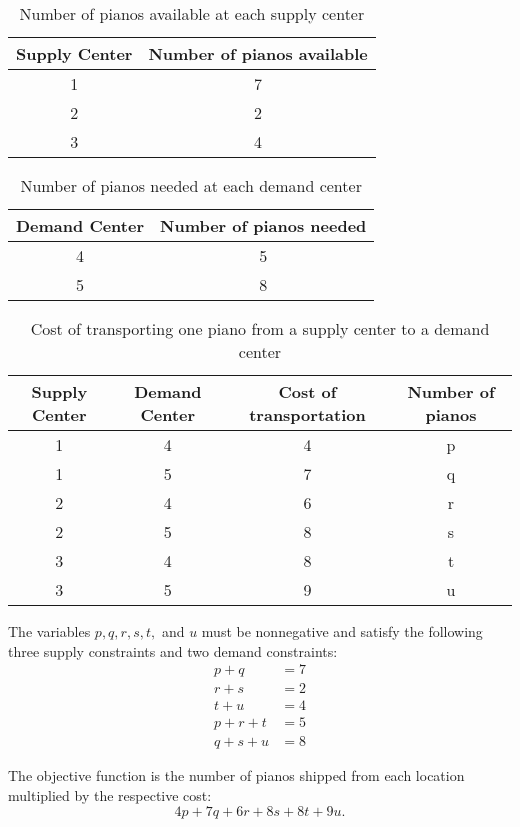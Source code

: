 \begin{table}[h]
\centering
\begin{tabular}{|c|c|}
Supply Center & Number of pianos available\\
\hline
1 & 7\\
2 & 2\\
3 & 4\\
\end{tabular}

\caption{Number of pianos available at each supply center}
\label{tab:supply}
\end{table}

\begin{table}[h]
\centering
\begin{tabular}{|c|c|}
Demand Center & Number of pianos needed\\
\hline
4 & 5\\
5 & 8\\
\end{tabular}

\caption{Number of pianos needed at each demand center}
\label{tab:demand}
\end{table}

\begin{table}[h]
\centering
\begin{tabular}{|c|c|c|c|}
Supply Center & Demand Center & Cost of transportation & Number of pianos\\
\hline
1 & 4 & 4 & p\\
1 & 5 & 7 & q\\
2 & 4 & 6 & r\\
2 & 5 & 8 & s\\
3 & 4 & 8 & t\\
3 & 5 & 9 & u\\
\end{tabular}
\caption{Cost of transporting one piano from a supply center to a demand center}
\label{tab:cost}
\end{table}

The variables $p,q,r,s,t,$ and $u$ must be nonnegative and satisfy the following three supply constraints and two demand constraints:
\begin{align*}
p + q  &= 7\\
r + s  &= 2\\
t + u  &= 4\\
p + r + t &= 5\\
q + s + u &= 8
\end{align*}

The objective function is the number of pianos shipped from each location multiplied by the respective cost:
\[
4p + 7q + 6r + 8s + 8t + 9u.
\]

